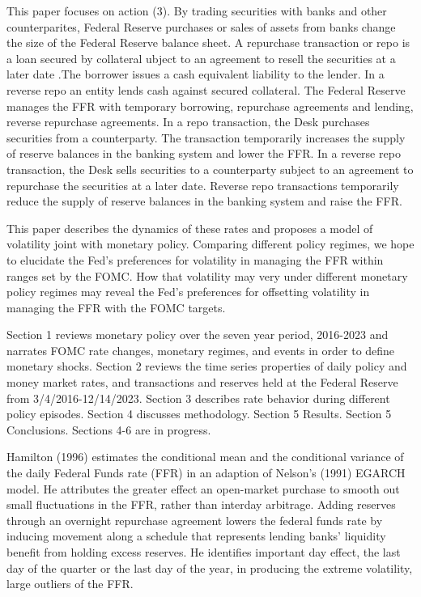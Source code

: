 \documentclass[
]{article}
\begin{document}
This paper focuses on action (3). By trading securities with banks and other counterparites, Federal Reserve purchases or sales of assets from banks change the size of the Federal Reserve balance sheet. A repurchase transaction or repo is a loan secured by collateral ubject to an agreement to resell the securities at a later date .The borrower issues a cash equivalent liability to the lender. In a reverse repo an entity lends cash against secured collateral. The Federal Reserve manages the FFR with temporary borrowing, repurchase agreements and lending, reverse repurchase agreements. In a repo transaction, the Desk purchases securities from a counterparty. The transaction temporarily increases the supply of reserve balances in the banking system and lower the FFR. In a reverse repo transaction, the Desk sells securities to a counterparty subject to an agreement to repurchase the securities at a later date. Reverse repo transactions temporarily reduce the supply of reserve balances in the banking system and raise the FFR.

This paper describes the dynamics of these rates and proposes a model of volatility joint with monetary policy. Comparing different policy regimes, we hope to elucidate the Fed's preferences for volatility in managing the FFR within ranges set by the FOMC. How that volatility may very under different monetary policy regimes may reveal the Fed's preferences for offsetting volatility in managing the FFR with the FOMC targets.

Section 1 reviews monetary policy over the seven year period, 2016-2023 and narrates FOMC rate changes, monetary regimes, and events in order to define monetary shocks.
Section 2 reviews the time series properties of daily policy and money market rates, and transactions and reserves held at the Federal Reserve from 3/4/2016-12/14/2023. Section 3 describes rate behavior during different policy episodes. Section 4 discusses methodology. Section 5 Results. Section 5 Conclusions. Sections 4-6 are in progress.

Hamilton (1996) estimates the conditional mean and the conditional variance of the daily Federal Funds rate (FFR) in an adaption of Nelson's (1991) EGARCH model. He attributes the greater effect an open-market purchase to smooth out small fluctuations in the FFR, rather than interday arbitrage. Adding reserves through an overnight repurchase agreement lowers the federal funds rate by inducing movement along a schedule that represents lending banks' liquidity benefit from holding excess reserves. He identifies important day effect, the last day of the quarter or the last day of the year, in producing the extreme volatility, large outliers of the FFR.
\end{document}
